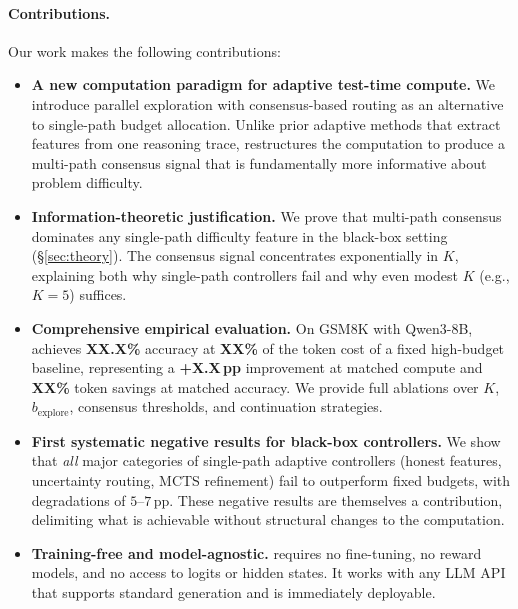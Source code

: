 \paragraph{Contributions.}
Our work makes the following contributions:
\begin{itemize}[nosep,leftmargin=*]
    \item \textbf{A new computation paradigm for adaptive test-time compute.}
    We introduce parallel exploration with consensus-based routing as an alternative to single-path budget allocation.
    Unlike prior adaptive methods that extract features from one reasoning trace, \method{} restructures the computation to produce a multi-path consensus signal that is fundamentally more informative about problem difficulty.

    \item \textbf{Information-theoretic justification.}
    We prove that multi-path consensus dominates any single-path difficulty feature in the black-box setting (\S\ref{sec:theory}).
    The consensus signal concentrates exponentially in $K$, explaining both why single-path controllers fail and why even modest $K$ (e.g., $K=5$) suffices.

    \item \textbf{Comprehensive empirical evaluation.}
    On GSM8K with Qwen3-8B, \method{} achieves \textbf{XX.X\%} accuracy at \textbf{XX\%} of the token cost of a fixed high-budget baseline, representing a \textbf{+X.X\,pp} improvement at matched compute and \textbf{XX\%} token savings at matched accuracy.
    We provide full ablations over $K$, $b_{\text{explore}}$, consensus thresholds, and continuation strategies.

    \item \textbf{First systematic negative results for black-box controllers.}
    We show that \emph{all} major categories of single-path adaptive controllers (honest features, uncertainty routing, MCTS refinement) fail to outperform fixed budgets, with degradations of $5$--$7$\,pp.
    These negative results are themselves a contribution, delimiting what is achievable without structural changes to the computation.

    \item \textbf{Training-free and model-agnostic.}
    \method{} requires no fine-tuning, no reward models, and no access to logits or hidden states.
    It works with any LLM API that supports standard generation and is immediately deployable.
\end{itemize}

